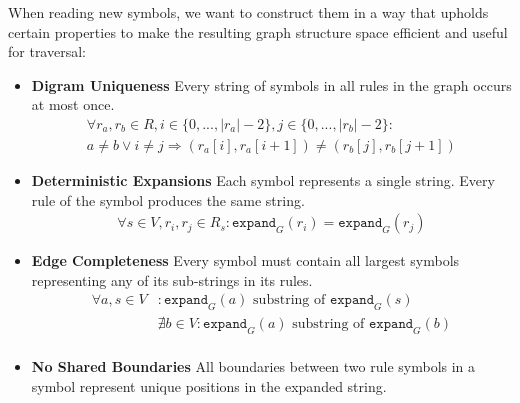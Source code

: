 When reading new symbols, we want to construct them in a way that upholds certain properties to make the resulting graph structure space efficient and useful for traversal:
\begin{itemize}
    \item \textbf{Digram Uniqueness} Every string of symbols in all rules in the graph occurs at most once.
    \begin{gather*}
        \forall r_a, r_b \in R, i \in \{ 0, ..., |r_a| - 2 \}, j \in \{ 0, ..., |r_b| - 2 \}:\\
        a \neq b \lor i \neq j \Longrightarrow (r_a[i], r_a[i + 1]) \neq (r_b[j], r_b[j + 1])
    \end{gather*}

    \item \textbf{Deterministic Expansions} Each symbol represents a single string. Every rule of the symbol produces the same string.
    \begin{align*}
        \forall s \in V, r_i, r_j \in R_s: \texttt{expand}_G(r_i) = \texttt{expand}_G(r_j)
    \end{align*}

    \item \textbf{Edge Completeness} Every symbol must contain all largest symbols representing any of its sub-strings in its rules.
    \begin{align*}
        \forall a, s \in V&: \texttt{expand}_G(a) \text{ substring of } \texttt{expand}_G(s) \\
        &\nexists b \in V: \texttt{expand}_G(a) \text{ substring of } \texttt{expand}_G(b) \\
    \end{align*}

    \item \textbf{No Shared Boundaries} All boundaries between two rule symbols in a symbol represent unique positions in the expanded string.
    \begin{gather*}
    \end{gather*}
\end{itemize}